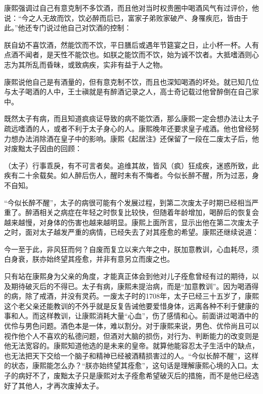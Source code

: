 
康熙强调过自己有意克制不多饮酒，而且他对当时权贵圈中喝酒风气有过评价，他说：“今之人无故而饮，饮必醉而后已，富家子弟败家破产、身罹疾厄，皆由于此。”他还专门说过他自己对饮酒的控制：



\begin{bookquote}朕自幼不喜饮酒，然能饮而不饮，平日膳后或遇年节筵宴之日，止小杯一杯。人有点酒不闻者，是天性不能饮也。如朕之能饮而不饮，始为诚不饮者。大抵嗜酒则心志为其所乱而昏昧，或致病疾，实非有益于人之物。\end{bookquote}


康熙说他自己是有酒量的，但有意克制不饮，而且也深知喝酒的坏处。就已知几位与太子喝酒的人中，王士禛就是有醉酒记录之人，高士奇记载过他曾醉倒在自己家中。



既然太子有病，而且知道疯痰证导致的病不能饮酒，那么康熙一定会想办法让太子疏远嗜酒的人，或者不利于太子身心的人。康熙晚年还要求皇子戒酒。他也曾经努力想办法消除酒在皇子中的影响。康熙《起居注》还保留了一段在二废太子后，他对废黜太子因由的回顾：



\begin{bookquote}（太子）行事乖戾，有不可言者矣。追维其故，皆风（疯）狂成疾，迷惑所致，此疾有二十余载矣。如人醉后伤人，醒时未有不悔者。今似长醉不醒，所为过恶，身不自知。\end{bookquote}


“今似长醉不醒”，太子的病很可能有个发展过程，到第二次废太子时期已经相当严重了。醉酒相关之病症在年轻之时恢复比较快，但随着年龄增加，喝醉后的恢复会越来越慢，对身体的伤害也越来越明显。康熙上面所言，显示出他在第二次废太子之时，面对太子越发严重的病情，已经失去了对其痊愈的希望。康熙还继续说道：



\begin{bookquote}今一至于此，非风狂而何？自废而复立以来六年之中，朕加意教训，心血耗尽，须白身衰，朕亦始终望其痊愈，并非有意另立而废之也。\end{bookquote}


只有站在康熙身为父亲的角度，才能真正体会到他对儿子痊愈曾经有过的期待，以及期待破灭后的不得已。太子有病，康熙未提治病，而是“加意教训”。因为喝酒得的病，除了戒酒，并没有灵药。一废太子时的1708年，太子已经三十五岁了，康熙这个老父亲还能教训的不外乎就是反复告诫他要爱惜身体，远离各种不利于健康的事和人。而这样教训，让康熙消耗大量“心血”，伤了感情和心。前面讲过喝酒中的优伶与男色问题。酒色本是一体，难以割分。对于康熙来说，男色、优伶尚且可以视作他个人不喜欢的私德问题，但酒对大脑的损伤，对行为、判断能力的改变则是他无法宽容的。康熙知道他选的是未来的皇帝。就算他能容忍太子生活中的缺点，也无法把天下交给一个脑子和精神已经被酒精损害过的人。“今似长醉不醒”，这样的状态，康熙能怎么办？“朕亦始终望其痊愈”，这句话是理解康熙心境的入口。太子的病好不了，废黜太子只是康熙对太子痊愈希望破灭后的措施，而不是他已经选好了其他人，才再次废掉太子。


